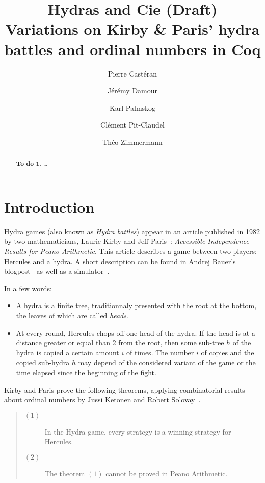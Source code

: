 \documentclass{easychair}
\title{Hydras and Cie (Draft) \\
  Variations on Kirby \& Paris' hydra battles and ordinal numbers in Coq}
\author{
Pierre Castéran \inst{1}
\and
    Jérémy Damour \inst{2}
\and
Karl Palmskog \inst{2}
\and Clément Pit-Claudel \inst{2}
\and Théo Zimmermann %
}
\institute{
 LaBRI, Université Bordeaux \\
  \email{pierre.casteran@labri.fr}
\and
   Ask for agreement !
 }
\newtheorem{todo}{To do}
\begin{document}
\maketitle


\begin{abstract}
  \begin{todo}
 \dots
  \end{todo}
\end{abstract}




\section{Introduction}
\label{sect:introduction}
Hydra games (also known as \emph{Hydra battles}) appear in an article published in 1982 by two mathematicians, 
Laurie Kirby and Jeff Paris~\cite{KP82}: \emph{Accessible Independence Results for Peano Arithmetic}.
This article describes a game between two players: Hercules and a hydra.
A short description  can be found in Andrej Bauer's blogpost~\cite{bauer2008} as well as a simulator~\cite{BauerHydra}.

In a few words:
\begin{itemize}
\item A hydra is a finite tree, traditionnaly presented with the root at the bottom, the leaves of which are called \emph{heads}.
\item At every round, Hercules chops off one head of the hydra. If the head is at a distance greater or equal than 2 from the root,
  then some sub-tree $h$ of the hydra is copied a certain amount $i$ of times. The number $i$ of copies and the copied sub-hydra $h$ may depend of the considered variant of the game
  or the time elapsed since the beginning of the fight.
\end{itemize}


Kirby and Paris prove the following theorems, applying
combinatorial results about ordinal numbers by Jussi Ketonen and Robert Solovay~\cite{KS81}.

\begin{quote}
\begin{description}
\item[$(1)$] In the Hydra game, every strategy is a winning strategy for Hercules.
  \item[$(2)$] The theorem $(1)$ cannot be proved in Peano Arithmetic.
\end{description}
\end{quote}
\end{document}
